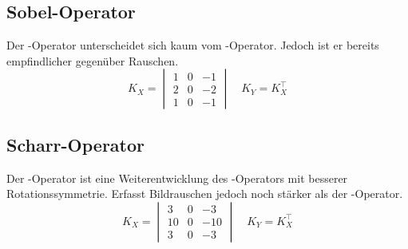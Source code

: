 \subsection*{Sobel-Operator}
Der -Operator unterscheidet sich kaum vom -Operator.
Jedoch ist er bereits empfindlicher gegenüber Rauschen.
  \[ K_X = \begin{vmatrix}
       1 & 0 & -1 \\
       2 & 0 & -2 \\
       1 & 0 & -1
     \end{vmatrix}
     \quad K_Y = K_X^\top \]

\subsection*{Scharr-Operator}
Der -Operator \cite[9.3]{scharr2000} ist eine Weiterentwicklung des -Operators mit besserer Rotationssymmetrie.
Erfasst Bildrauschen jedoch noch stärker als der -Operator.
  \[ K_X = \begin{vmatrix}
        3 & 0 & -3 \\
       10 & 0 & -10 \\
        3 & 0 & -3
     \end{vmatrix}
     \quad K_Y = K_X^\top \]


